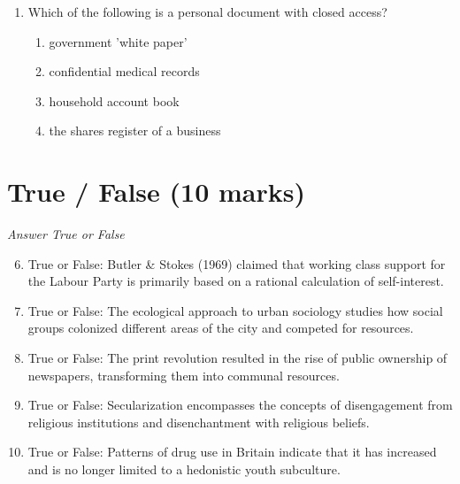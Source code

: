 \documentclass[12pt]{article}
\begin{document}
\begin{enumerate}[label=\arabic*.]
\begin{enumerate}[label=(\alph*)]
    \item shared working conditions in the manufacturing industry
    \item the class consciousness of members of the proletariat
    \item local communities, extended kinship networks and shared leisure pursuits
    \item collective aspirations to move into the middle class
\end{enumerate}
\item Which of the following is a personal document with closed access?
\begin{enumerate}[label=(\alph*)]
    \item government 'white paper'
    \item confidential medical records
    \item household account book
    \item the shares register of a business
\end{enumerate}
\end{enumerate}

\section*{True / False (10 marks)}
\textit{Answer True or False}
\begin{enumerate}[label=\arabic*.]
\setcounter{enumi}{5}
\item True or False: Butler \& Stokes (1969) claimed that working class support for the Labour Party is primarily based on a rational calculation of self-interest.
\item True or False: The ecological approach to urban sociology studies how social groups colonized different areas of the city and competed for resources.
\item True or False: The print revolution resulted in the rise of public ownership of newspapers, transforming them into communal resources.
\item True or False: Secularization encompasses the concepts of disengagement from religious institutions and disenchantment with religious beliefs.
\item True or False: Patterns of drug use in Britain indicate that it has increased and is no longer limited to a hedonistic youth subculture.
\end{enumerate}
\end{document}
